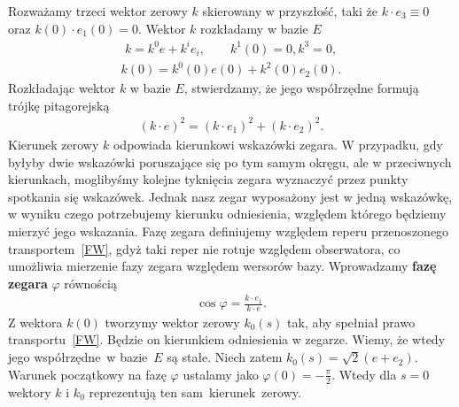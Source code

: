 Rozważamy trzeci wektor zerowy $k$ skierowany w przyszłość, taki 
że $k\cdot e_3 \equiv 0$ oraz $k(0)\cdot e_1(0) =0$.  
Wektor $k$ rozkładamy w bazie $E$
\begin{align*}
k = k^0 e +  k^i e_i, \qquad k^1(0)=0, k^3 = 0,
\end{align*}
\begin{align*}
k(0) = k^0(0) e(0) + k^2(0) e_2(0) .
\end{align*}
Rozkładając wektor $k$ w bazie $E$, stwierdzamy, że jego współrzędne 
formują trójkę pitagorejską 
\begin{align}
(k \cdot e)^2 = (k \cdot e_1)^2 +  (k \cdot e_2)^2 .
\end{align}
Kierunek zerowy $k$ odpowiada kierunkowi wskazówki zegara. 
 W przypadku, gdy byłyby 
dwie wskazówki poruszające się po tym samym okręgu, ale w 
przeciwnych kierunkach, moglibyśmy kolejne tyknięcia zegara
wyznaczyć przez punkty spotkania się wskazówek. 
Jednak nasz zegar wyposażony jest w jedną wskazówkę, w wyniku 
czego
potrzebujemy kierunku odniesienia, względem którego będziemy 
mierzyć jego wskazania. Fazę zegara definiujemy względem reperu
przenoszonego transportem~\eqref{FW}, gdyż taki reper nie 
rotuje względem obserwatora, co umożliwia mierzenie  
fazy zegara względem wersorów bazy. 
Wprowadzamy \textbf{fazę zegara} $\varphi$ 
równością
\begin{align}\label{phi_definition}
\cos\varphi = \frac{k\cdot e_1}{k\cdot e}.
\end{align}
Z wektora $k(0)$ tworzymy wektor zerowy $k_0(s)$ tak, aby spełniał 
prawo transportu~\eqref{FW}. Będzie on kierunkiem odniesienia 
w zegarze. Wiemy, że wtedy jego współrzędne~w 
bazie~$E$ są stałe. Niech zatem
$k_0(s) =  \sqrt{2} (e + e_2)$.
Warunek początkowy na fazę $\varphi$ ustalamy jako
$\varphi(0)=-\frac{\pi}{2}$. Wtedy dla $s=0$ wektory
$k$ i $k_0$ reprezentują ten \mbox{sam kierunek~zerowy.}

